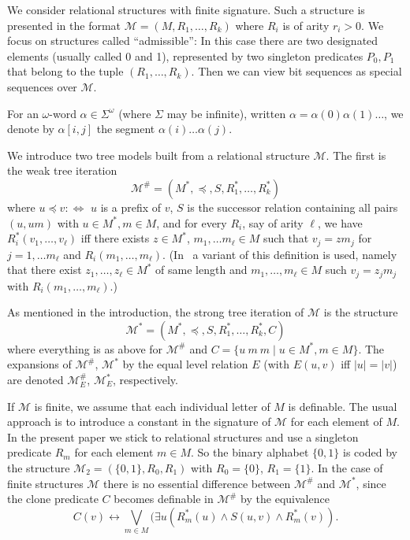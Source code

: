 \documentclass[copyright,creativecommons]{eptcs}
\theoremstyle{plain}
\theoremstyle{nonumberplain}
\newcommand{\m}{\ensuremath{\mathcal{M}}}
\newcommand{\Mweak}{\ensuremath{\m^{\#}}}
\newcommand{\MweakE}{\ensuremath{\m^{\#}_E}}
\newcommand{\Mstrong}{\ensuremath{\m^*}}
\newcommand{\MstrongE}{\ensuremath{\m^*_E}}
\begin{document}
We consider relational structures with finite signature. Such a structure 
is presented in the format $\m = (M, R_1, \ldots, R_k)$ where $R_i$ is of arity $r_i > 0$. 
We focus on structures called ``admissible'': In this case there are 
two designated elements (usually called 0 and 1), represented by 
two singleton predicates $P_0, P_1$ that belong to the tuple $(R_1, \ldots, R_k)$.
Then we can view bit sequences as special sequences over $\m$. 

For an $\omega$-word $\alpha \in \Sigma^\omega$ (where $\Sigma$ may be infinite), 
written $\alpha = \alpha(0) \alpha(1) \ldots$,  
we denote by $\alpha[i,j]$ the segment $\alpha(i) \ldots \alpha(j)$.

We introduce two tree models built from a relational structure $\m$. 
The first is the weak tree iteration 
$$\Mweak = (M^*,\preceq, S, {R^*_1},\ldots, {R^*_k})$$ 
where 
$u \preceq v :\Leftrightarrow$ $u$ is a prefix of $v$, $S$ is the successor relation 
containing all pairs $(u, um)$ with $u \in M^*, m \in M$, and  
for every $R_i$, say of arity $\ell$, we have ${R^*_i}(v_1,\dots,v_\ell)$ iff 
there exists $z \in M^*$, $m_1, \ldots m_\ell \in M$ such that $v_j = z m_j$
for $j = 1, \ldots m_\ell$ and $R_i(m_1, \ldots, m_\ell)$. (In~\cite{bes08}
a variant of this definition is used, namely that there exist
$z_1, \ldots, z_\ell \in M^*$ of same length and $m_1, \ldots, m_\ell \in M$ 
such $v_j = z_j m_j$ with $R_i(m_1, \ldots, m_\ell)$.) 

As mentioned in the introduction, the strong tree iteration of $\m$ is the structure 
$$\Mstrong = (M^*,\preceq, S, {R^*_1},\ldots, {R^*_k}, C)$$
where everything is as above for $\Mweak$ and $C = \{u \ m \ m \mid u \in M^* , m \in M\}$. 
The expansions of $\Mweak$, $\Mstrong$ by the equal level relation $E$ (with $E(u,v)$ iff 
$|u| = |v|$) are denoted $\MweakE$, $\MstrongE$, respectively. 

If $\m$ is finite, we assume that each individual letter of $M$ is definable.
The usual approach is to introduce a constant in the signature of $\m$ for each 
element of $M$. In the present paper we stick to relational structures and 
use a singleton predicate $R_m$ for each element $m \in M$. So the binary 
alphabet $\{0,1\}$ is coded by the structure $\m_2 = (\{0,1\}, R_0, R_1)$ with 
$R_0 = \{0\}$, $R_1 = \{1\}$. In the case of finite structures $\m$ 
there is no essential difference between 
$\Mweak$ and $\Mstrong$, since the clone predicate $C$ becomes definable in $\m^\#$ by 
the equivalence 
$$C(v) \leftrightarrow \bigvee_{m \in M} (\exists u(R_m^*(u) \wedge S(u,v) \wedge R_m^*(v)).$$
\end{document}
